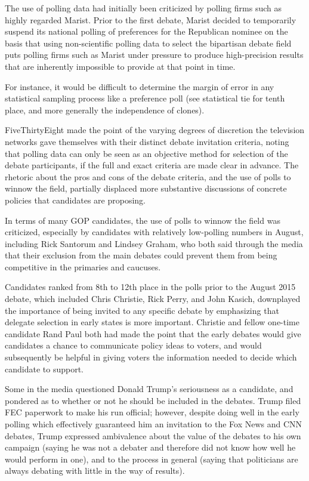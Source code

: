 The use of polling data had initially been criticized by polling firms
such as highly regarded Marist. Prior to the first debate, Marist
decided to temporarily suspend its national polling of preferences for
the Republican nominee on the basis that using non-scientific polling
data to select the bipartisan debate field puts polling firms such as
Marist under pressure to produce high-precision results that are
inherently impossible to provide at that point in time.

For instance, it would be difficult to determine the margin of error in
any statistical sampling process like a preference poll (see statistical
tie for tenth place, and more generally the independence of clones).

FiveThirtyEight made the point of the varying degrees of discretion the
television networks gave themselves with their distinct debate
invitation criteria, noting that polling data can only be seen as an
objective method for selection of the debate participants, if the full
and exact criteria are made clear in advance. The rhetoric about the
pros and cons of the debate criteria, and the use of polls to winnow the
field, partially displaced more substantive discussions of concrete
policies that candidates are proposing.

In terms of many GOP candidates, the use of polls to winnow the field
was criticized, especially by candidates with relatively low-polling
numbers in August, including Rick Santorum and Lindsey Graham, who both
said through the media that their exclusion from the main debates could
prevent them from being competitive in the primaries and caucuses.

Candidates ranked from 8th to 12th place in the polls prior to the
August 2015 debate, which included Chris Christie, Rick Perry, and John
Kasich, downplayed the importance of being invited to any specific
debate by emphasizing that delegate selection in early states is more
important. Christie and fellow one-time candidate Rand Paul both had
made the point that the early debates would give candidates a chance to
communicate policy ideas to voters, and would subsequently be helpful in
giving voters the information needed to decide which candidate to
support.

Some in the media questioned Donald Trump's seriousness as a candidate,
and pondered as to whether or not he should be included in the debates.
Trump filed FEC paperwork to make his run official; however, despite
doing well in the early polling which effectively guaranteed him an
invitation to the Fox News and CNN debates, Trump expressed ambivalence
about the value of the debates to his own campaign (saying he was not a
debater and therefore did not know how well he would perform in one),
and to the process in general (saying that politicians are always
debating with little in the way of results).

